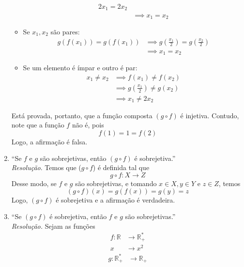 \begin{enumerate}
\begin{itemize}
\begin{align*}
            2x_1 = 2x_2 \\ & \implies
            x_1 = x_2
        \end{align*}    
        \item Se $x_1, x_2$ são pares:
        \begin{align*}
            g(f(x_1)) = g(f(x_1)) & \implies
            g(\frac{x_1}{2}) = g(\frac{x_2}{2}) \\ & \implies 
            x_1 = x_2
        \end{align*}
        \item Se um elemento é ímpar e outro é par:
        \begin{align*}
            x_1 \ne x_2 & \implies f(x_1) \ne f(x_2) \\ & \implies
            g(\frac{x_1}{2}) \ne g(x_2) \\ & \implies
            x_1 \ne 2x_2
        \end{align*}
    \end{itemize}
    Está provada, portanto, que a função composta $(g \circ f)$ é injetiva. Contudo, note que a função $f$ não é, pois
    \begin{displaymath}
        f(1) = 1 = f(2)
    \end{displaymath}
    Logo, a afirmação é falsa.
    \item \enquote{Se $f$ e $g$ são sobrejetivas, então $(g\circ f)$ é sobrejetiva.}
    \\ \emph{Resolução}. Temos que ($g \circ f$) é definida tal que
    \begin{displaymath}
        g \circ f: X \rightarrow Z 
    \end{displaymath}
    Desse modo, se $f$ e $g$ são sobrejetivas, e tomando $x \in X, y \in Y$ e $z \in Z$, temos
    \begin{displaymath}
        (g\circ f)(x) = g(f(x)) = g(y) = z
    \end{displaymath}
    Logo, $(g \circ f)$ é sobrejetiva e a afirmação é verdadeira.
    \item \enquote{Se $(g \circ f)$ é sobrejetiva, então $f \text{ e } g$ são sobrejetivas.}
    \\ \emph{Resolução.} Sejam as funções
    \begin{align*}
        f: \mathbb{R} &\rightarrow \mathbb{R}^*_+ \\
        x &\rightarrow x^2
    \end{align*}
    \begin{align*}
        g: \mathbb{R}^*_+ &\rightarrow \mathbb{R}_+ \\

\end{align*}
\end{enumerate}
